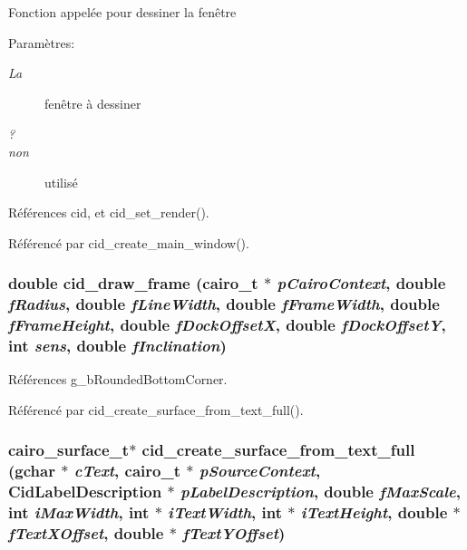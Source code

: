 Fonction appelée pour dessiner la fenêtre \begin{Desc}
\item[Paramètres:]
\begin{description}
\item[{\em La}]fenêtre à dessiner \item[{\em ?}]\item[{\em non}]utilisé \end{description}
\end{Desc}


Références cid, et cid\_\-set\_\-render().

Référencé par cid\_\-create\_\-main\_\-window().
\subsubsection{\setlength{\rightskip}{0pt plus 5cm}double cid\_\-draw\_\-frame (cairo\_\-t $\ast$ {\em pCairoContext}, \/  double {\em fRadius}, \/  double {\em fLineWidth}, \/  double {\em fFrameWidth}, \/  double {\em fFrameHeight}, \/  double {\em fDockOffsetX}, \/  double {\em fDockOffsetY}, \/  int {\em sens}, \/  double {\em fInclination})}\label{cid-main_8c_a7341465137057e0f0942099264a106f}




Références g\_\-bRoundedBottomCorner.

Référencé par cid\_\-create\_\-surface\_\-from\_\-text\_\-full().
\subsubsection{\setlength{\rightskip}{0pt plus 5cm}cairo\_\-surface\_\-t$\ast$ cid\_\-create\_\-surface\_\-from\_\-text\_\-full (gchar $\ast$ {\em cText}, \/  cairo\_\-t $\ast$ {\em pSourceContext}, \/  {\bf CidLabelDescription} $\ast$ {\em pLabelDescription}, \/  double {\em fMaxScale}, \/  int {\em iMaxWidth}, \/  int $\ast$ {\em iTextWidth}, \/  int $\ast$ {\em iTextHeight}, \/  double $\ast$ {\em fTextXOffset}, \/  double $\ast$ {\em fTextYOffset})}\label{cid-main_8c_9afee349a212189511ca97c8b8904831}




